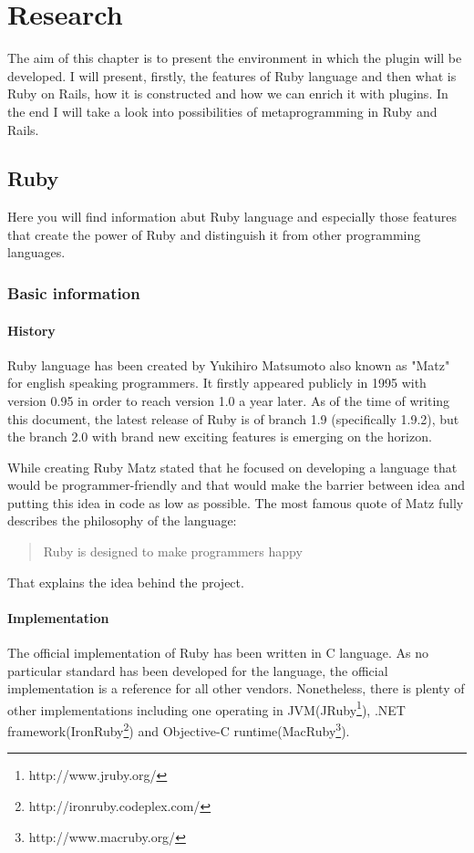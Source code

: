 
\chapter{Research}
  The aim of this chapter is to present the environment in which the plugin will be developed. I will present, firstly, the features of Ruby language and then what is Ruby on Rails, how it is constructed and how we can enrich it with plugins. In the end I will take a look into possibilities of metaprogramming in Ruby and Rails.
  
  \section{Ruby}
  Here you will find information abut Ruby language and especially those features that create the power of Ruby and distinguish it from other programming languages.
    \subsection{Basic information}
      \subsubsection{History}
      Ruby language has been created by Yukihiro Matsumoto also known as "Matz" for english speaking programmers. It firstly appeared publicly in 1995 with version 0.95 in order to reach version 1.0 a year later. As of the time of writing this document, the latest release of Ruby is of branch 1.9 (specifically 1.9.2), but the branch 2.0 with brand new exciting features is emerging on the horizon.
    
      While creating Ruby Matz stated that he focused on developing a language that would be programmer-friendly and that would make the barrier between idea and putting this idea in code as low as possible. The most famous quote of Matz fully describes the philosophy of the language:
    
      \begin{quote}
        Ruby is designed to make programmers happy
      \end{quote}
    
      That explains the idea behind the project.
    
      \subsubsection{Implementation}
      The official implementation of Ruby has been written in C language. As no particular standard has been developed for the language, the official implementation is a reference for all other vendors. Nonetheless, there is plenty of other implementations including one operating in JVM(JRuby\footnote{http://www.jruby.org/}), .NET framework(IronRuby\footnote{http://ironruby.codeplex.com/}) and Objective-C runtime(MacRuby\footnote{http://www.macruby.org/}).
    
